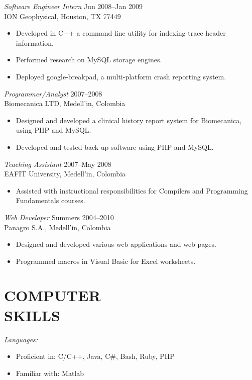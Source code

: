 \documentclass[line,margin]{res}
\begin{document}
\begin{resume}
{\sl Software Engineer Intern} \hfill Jun 2008--Jan 2009\\
ION Geophysical, Houston, TX 77449
\begin{itemize} \itemsep -2pt
    \item Developed in C++ a command line utility for indexing trace header information.
    \item Performed research on MySQL storage engines.
    \item Deployed google-breakpad, a multi-platform crash reporting system.
\end{itemize}

{\sl Programmer/Analyst} \hfill 2007--2008\\
Biomecanica LTD, Medell\a'in, Colombia
\begin{itemize} \itemsep -2pt
    \item Designed and developed a clinical history report system for Biomecanica, using PHP and MySQL.
    \item Developed and tested back-up software using PHP and MySQL.
\end{itemize}

{\sl Teaching Assistant} \hfill 2007--May 2008\\
EAFIT University, Medell\a'in, Colombia
\begin{itemize} \itemsep -2pt
    \item  Assisted with instructional responsibilities for Compilers and Programming Fundamentals courses.
\end{itemize}

{\sl Web Developer} \hfill Summers  2004--2010\\
Panagro S.A., Medell\a'in, Colombia
\begin{itemize} \itemsep -2pt
    \item Designed and developed various web applications and web pages.  
    \item Programmed macros in Visual Basic for Excel worksheets.
\end{itemize}

 
\section{COMPUTER \\ SKILLS} %
\label{sec:computer_skills}
    {\sl Languages:}
    \begin{itemize} \itemsep -2pt
        \item Proficient in: C/C++, Java, C\#, Bash, Ruby, PHP
        \item Familiar with: Matlab
    \end{itemize}


\end{resume}
\end{document}
